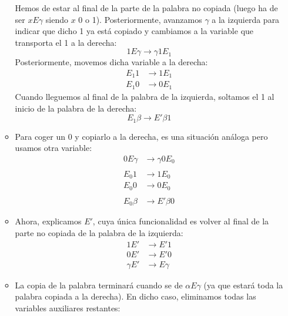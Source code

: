 \begin{ejercicio}
\begin{enumerate}
\begin{itemize}
                    Hemos de estar al final de la parte de la palabra no copiada (luego ha de ser $xE\gamma$ siendo $x$ 0 o 1). Posteriormente, avanzamos $\gamma$ a la izquierda para indicar que dicho 1 ya está copiado y cambiamos a la variable que transporta el 1 a la derecha:
                    \begin{equation*}
                        1E\gamma \rightarrow \gamma 1 E_1 
                    \end{equation*}
                    Posteriormente, movemos dicha variable a la derecha:
                    \begin{align*}
                        E_1 1 &\rightarrow 1E_1 \\
                        E_1 0 &\rightarrow 0E_1
                    \end{align*}
                    Cuando lleguemos al final de la palabra de la izquierda, soltamos el 1 al inicio de la palabra de la derecha:
                    \begin{equation*}
                        E_1 \beta \rightarrow E' \beta 1
                    \end{equation*}
                \item Para coger un 0 y copiarlo a la derecha, es una situación análoga pero usamos otra variable:
                    \begin{align*}
                        0E\gamma &\rightarrow \gamma 0 E_0 \\
                        \\
                        E_0 1 &\rightarrow 1E_0 \\
                        E_0 0 &\rightarrow 0E_0 \\
                        \\
                        E_0 \beta &\rightarrow E'\beta 0
                    \end{align*}
                \item Ahora, explicamos $E'$, cuya única funcionalidad es volver al final de la parte no copiada de la palabra de la izquierda:
                    \begin{align*}
                        1E' &\rightarrow E'1 \\
                        0E' &\rightarrow E'0 \\
                        \gamma E' &\rightarrow E\gamma
                    \end{align*}
                \item La copia de la palabra terminará cuando se de $\alpha E\gamma$ (ya que estará toda la palabra copiada a la derecha). En dicho caso, eliminamos todas las variables auxiliares restantes:

\end{itemize}
\end{enumerate}
\end{ejercicio}

